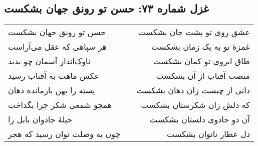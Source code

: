 \begin{center}
\section*{غزل شماره ۷۳: حسن تو رونق جهان بشکست}
\label{sec:073}
\begin{longtable}{l p{0.5cm} r}
حسن تو رونق جهان بشکست
&&
عشق روی تو پشت جان بشکست
\\
هر سپاهی که عقل می‌آراست
&&
غمزهٔ تو به یک زمان بشکست
\\
ناوک‌انداز آسمان چو بدید
&&
طاق ابروی تو کمان بشکست
\\
عکس ماهت به آفتاب رسید
&&
منصب آفتاب از آن بشکست
\\
پسته را پهن بازمانده دهان
&&
دانی از چیست زان دهان بشکست
\\
همچو شمعی شکر چرا بگداخت
&&
که دلش زان شکرستان بشکست
\\
حیلهٔ جادوان بابل را
&&
آن دو جادوی دلستان بشکست
\\
چون به وصلت توان رسید که هجر
&&
دل عطار ناتوان بشکست
\\
\end{longtable}
\end{center}
